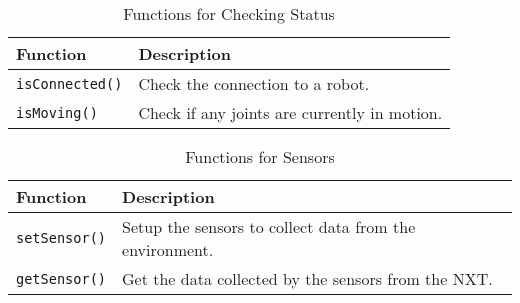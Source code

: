 \begin{table}[!h]
\caption{Functions for Checking Status}
\begin{tabular}{ p{6cm}p{10cm}}\hline
Function & Description\\
\hline
\texttt{isConnected()}    &Check the connection to a robot.\\
\texttt{isMoving()}       &Check if any joints are currently in motion.\\
\hline
\end{tabular}
\end{table}

\begin{table}[!h]
\caption{Functions for Sensors}
\begin{tabular}{ p{6cm}p{10cm}}\hline
Function & Description\\
\hline
\texttt{setSensor()}       &Setup the sensors to collect data from the environment.\\
\texttt{getSensor()}       &Get the data collected by the sensors from the NXT.\\
\hline
\end{tabular}
\end{table}

